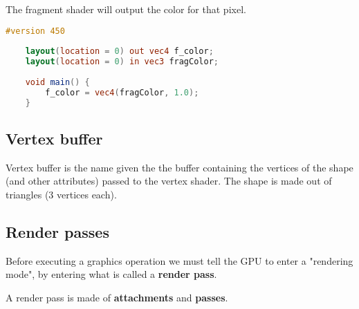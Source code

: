 \documentclass{article}
\begin{document}
The fragment shader will output the color for that pixel.

\begin{lstlisting}[language=GLSL, caption={Fragment Shader}]
    #version 450
            
    layout(location = 0) out vec4 f_color;
    layout(location = 0) in vec3 fragColor;
    
    void main() {
        f_color = vec4(fragColor, 1.0);
    }
\end{lstlisting}

\subsection{Vertex buffer}

Vertex buffer is the name given the the buffer containing the vertices
of the shape (and other attributes) passed to the vertex shader.
The shape is made out of triangles (3 vertices each).

\subsection{Render passes}

Before executing a graphics operation we must tell the GPU to enter a "rendering mode",
by entering what is called a \textbf{render pass}.

A render pass is made of \textbf{attachments} and \textbf{passes}.

\end{document}
